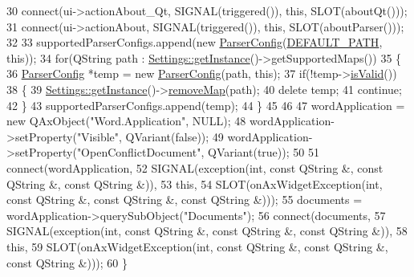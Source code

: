\begin{DoxyCode}
30     connect(ui->actionAbout\_Qt, SIGNAL(triggered()), \textcolor{keyword}{this}, SLOT(aboutQt()));
31     connect(ui->actionAbout, SIGNAL(triggered()), \textcolor{keyword}{this}, SLOT(aboutParser()));
32 
33     supportedParserConfigs.append(\textcolor{keyword}{new} \hyperlink{class_parser_config}{ParserConfig}(\hyperlink{mainwindow_8h_a72c1937b26ce9a87266ca6c802b047a0}{DEFAULT\_PATH}, \textcolor{keyword}{this}));
34     \textcolor{keywordflow}{for}(QString path : \hyperlink{class_settings_a5134bac1c68824ef48651c8469cf8722}{Settings::getInstance}()->getSupportedMaps())
35     \{
36         \hyperlink{class_parser_config}{ParserConfig} *temp = \textcolor{keyword}{new} \hyperlink{class_parser_config}{ParserConfig}(path, \textcolor{keyword}{this});
37         \textcolor{keywordflow}{if}(!temp->\hyperlink{class_parser_config_a8693076fd02fe0bdad9cab47c31e83cd}{isValid}())
38         \{
39             \hyperlink{class_settings_a5134bac1c68824ef48651c8469cf8722}{Settings::getInstance}()->\hyperlink{class_settings_a62312388f51c4c1a185a933128ec2e50}{removeMap}(path);
40             \textcolor{keyword}{delete} temp;
41             \textcolor{keywordflow}{continue};
42         \}
43         supportedParserConfigs.append(temp);
44     \}
45 
46 
47     wordApplication = \textcolor{keyword}{new} QAxObject(\textcolor{stringliteral}{"Word.Application"}, NULL);
48     wordApplication->setProperty(\textcolor{stringliteral}{"Visible"}, QVariant(\textcolor{keyword}{false}));
49     wordApplication->setProperty(\textcolor{stringliteral}{"OpenConflictDocument"}, QVariant(\textcolor{keyword}{true}));
50 
51     connect(wordApplication,
52             SIGNAL(exception(\textcolor{keywordtype}{int}, \textcolor{keyword}{const} QString &, \textcolor{keyword}{const} QString &, \textcolor{keyword}{const} QString &)),
53             \textcolor{keyword}{this},
54             SLOT(onAxWidgetException(\textcolor{keywordtype}{int}, \textcolor{keyword}{const} QString &, \textcolor{keyword}{const} QString &, \textcolor{keyword}{const} QString &)));
55     documents = wordApplication->querySubObject(\textcolor{stringliteral}{"Documents"});
56     connect(documents,
57             SIGNAL(exception(\textcolor{keywordtype}{int}, \textcolor{keyword}{const} QString &, \textcolor{keyword}{const} QString &, \textcolor{keyword}{const} QString &)),
58             \textcolor{keyword}{this},
59             SLOT(onAxWidgetException(\textcolor{keywordtype}{int}, \textcolor{keyword}{const} QString &, \textcolor{keyword}{const} QString &, \textcolor{keyword}{const} QString &)));
60 \}
\end{DoxyCode}
\mbox{\label{class_main_window_ae98d00a93bc118200eeef9f9bba1dba7}} 
